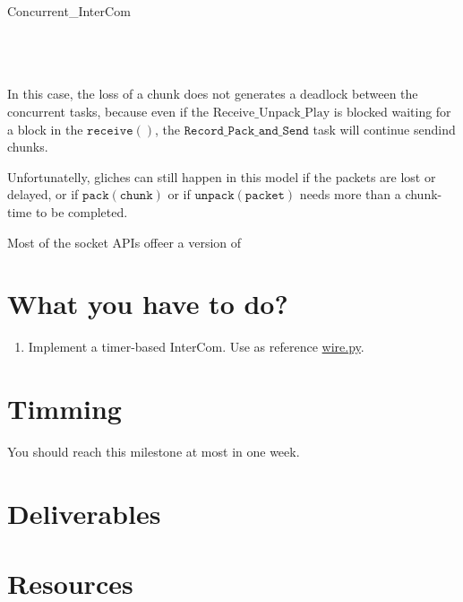 \begin{pseudocode}{Concurrent\_InterCom}{~}
  \BEGIN
     \GETS {}\\
     \GETS {}\\
  \END
  \ENDPROCEDURE
  \BEGIN
     \GETS {}\\
     \GETS {}\\
  \END
  \ENDPROCEDURE
\end{pseudocode}

In this case, the loss of a chunk does not generates a deadlock
between the concurrent tasks, because even if the
$\mathrm{Receive\_Unpack\_Play}$ is blocked waiting for a block in the
$\mathtt{receive()}$, the $\mathtt{Record\_Pack\_and\_Send}$ task will
continue sendind chunks.

Unfortunatelly, gliches can still happen in this model if the packets
are lost or delayed, or if $\mathtt{pack(chunk)}$ or if
$\mathtt{unpack(packet)}$ needs more than a chunk-time to be
completed.

Most of the socket APIs offeer a version of 


\section{What you have to do?}

\begin{enumerate}

\item Implement a timer-based InterCom. Use as reference \href{https://github.com/Tecnologias-multimedia/intercom/blob/master/test/sounddevice/wire.py}{wire.py}.
  
\end{enumerate}

\section{Timming}

You should reach this milestone at most in one week.

\section{Deliverables}

\section{Resources}


